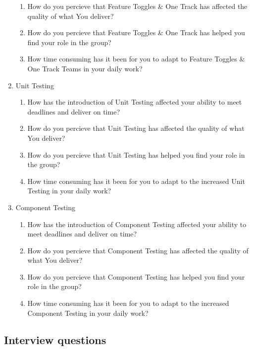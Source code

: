 \documentclass[final_report_innit.tex]{subfiles}
\begin{document}
\begin{enumerate}
\begin{enumerate}
		\item How do you percieve that Feature Toggles \& One Track has affected the quality of what You deliver?
		\item How do you percieve that Feature Toggles \& One Track has helped you find your role in the group?
		\item How time consuming has it been for you to adapt to Feature Toggles \& One Track Teams in your daily work?
	\end{enumerate}
	\item Unit Testing
	\begin{enumerate}
		\item How has the introduction of Unit Testing affected your ability to meet deadlines and deliver on time?
		\item How do you percieve that Unit Testing has affected the quality of what You deliver?
		\item How do you percieve that Unit Testing has helped you find your role in the group?
		\item How time consuming has it been for you to adapt to the increased Unit Testing in your daily work?
	\end{enumerate}
	\item Component Testing
	\begin{enumerate}
		\item How has the introduction of Component Testing affected your ability to meet deadlines and deliver on time?
		\item How do you percieve that Component Testing has affected the quality of what You deliver?
		\item How do you percieve that Component Testing has helped you find your role in the group?
		\item How time consuming has it been for you to adapt to the increased Component Testing in your daily work?
	\end{enumerate}
\end{enumerate}

\subsection{Interview questions}
\end{document}
